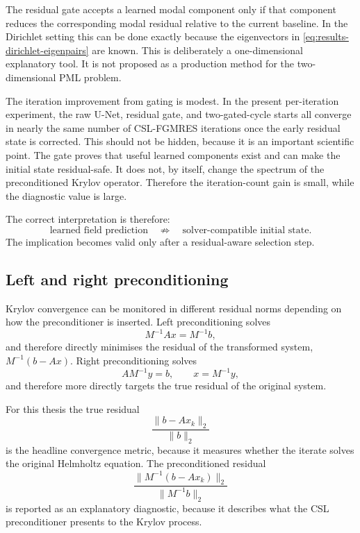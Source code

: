 The residual gate accepts a learned modal component only if that component
reduces the corresponding modal residual relative to the current baseline. In
the Dirichlet setting this can be done exactly because the eigenvectors in
\eqref{eq:results-dirichlet-eigenpairs} are known. This is deliberately a
one-dimensional explanatory tool. It is not proposed as a production method
for the two-dimensional PML problem.

The iteration improvement from gating is modest. In the present
per-iteration experiment, the raw U-Net, residual gate, and two-gated-cycle
starts all converge in nearly the same number of CSL-FGMRES iterations once
the early residual state is corrected. This should not be hidden, because it is
an important scientific point. The gate proves that useful learned components
exist and can make the initial state residual-safe. It does not, by itself,
change the spectrum of the preconditioned Krylov operator. Therefore the
iteration-count gain is small, while the diagnostic value is large.

The correct interpretation is therefore:
\[
\text{learned field prediction}
\quad\not\Rightarrow\quad
\text{solver-compatible initial state}.
\]
The implication becomes valid only after a residual-aware selection step.

\subsection{Left and right preconditioning}
\label{subsec:results-left-right}

Krylov convergence can be monitored in different residual norms depending on
how the preconditioner is inserted. Left preconditioning solves
\[
    M^{-1}A x = M^{-1}b,
\]
and therefore directly minimises the residual of the transformed system,
$M^{-1}(b-Ax)$. Right preconditioning solves
\[
    A M^{-1} y = b,
    \qquad x = M^{-1}y,
\]
and therefore more directly targets the true residual of the original system.

For this thesis the true residual
\[
    \frac{\|b-Ax_k\|_2}{\|b\|_2}
\]
is the headline convergence metric, because it measures whether the iterate
solves the original Helmholtz equation. The preconditioned residual
\[
    \frac{\|M^{-1}(b-Ax_k)\|_2}{\|M^{-1}b\|_2}
\]
is reported as an explanatory diagnostic, because it describes what the CSL
preconditioner presents to the Krylov process.

